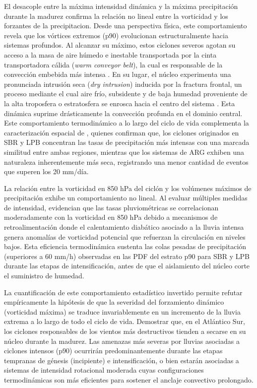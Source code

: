 El desacople entre la máxima intensidad dinámica y la máxima precipitación durante la madurez confirma la relación no lineal entre la vorticidad y los forzantes de la precipitacion. Desde una perspectiva física, este comportamiento revela que los vórtices extremos (p90) evolucionan estructuralmente hacia sistemas profundos. Al alcanzar su máximo, estos ciclones severos agotan su acceso a la masa de aire húmedo e inestable transportada por la cinta transportadora cálida (\textit{warm conveyor belt}), la cual es responsable de la convección embebida más intensa \citep{oertel2021warm, blanchard2021warm}. En su lugar, el núcleo experimenta una pronunciada intrusión seca (\textit{dry intrusion}) inducida por la fractura frontal, un proceso mediante el cual aire frío, subsidente y de baja humedad proveniente de la alta troposfera o estratosfera se enrosca hacia el centro del sistema \citep{shapiro1999bridge}. Esta dinámica suprime drásticamente la convección profunda en el dominio central. 
Este comportamiento termodinámico a lo largo del ciclo de vida complementa la caracterización espacial de \citet{gramcianinov2019properties}, quienes confirman que, los ciclones originados en SBR y LPB concentran las tasas de precipitación más intensas con una marcada similitud entre ambas regiones, mientras que los sistemas de ARG exhiben una naturaleza inherentemente más seca, registrando una menor cantidad de eventos que superen los 20 mm/día.

La relación entre la vorticidad en 850 hPa del ciclón y los volúmenes máximos de precipitación exhibe un comportamiento no lineal. Al evaluar múltiples medidas de intensidad, \citet{corner2025classification} evidencian que las tasas pluviométricas se correlacionan moderadamente con la vorticidad en 850 hPa debido a mecanismos de retroalimentación donde el calentamiento diabático asociado a la lluvia intensa genera anomalías de vorticidad potencial que refuerzan la circulación en niveles bajos. Esta eficiencia termodinámica sustenta las colas pesadas de precipitación (superiores a 60 mm/h) observadas en las PDF del estrato p90 para SBR y LPB durante las etapas de intensificación, antes de que el aislamiento del núcleo corte el suministro de humedad.

La cuantificación de este comportamiento estadístico invertido permite refutar empíricamente la hipótesis de que la severidad del forzamiento dinámico (vorticidad máxima) se traduce invariablemente en un incremento de la lluvia extrema a lo largo de todo el ciclo de vida. Demostrar que, en el Atlántico Sur, los ciclones responsables de los vientos más destructivos tienden a secarse en su núcleo durante la madurez. Las amenazas más severas por lluvias asociadas a ciclones intensos (p90) ocurrirán predominantemente durante las etapas tempranas de génesis (incipiente) e intensificación, o bien estarán asociadas a sistemas de intensidad rotacional moderada cuyas configuraciones termodinámicas son más eficientes para sostener el anclaje convectivo prolongado.

